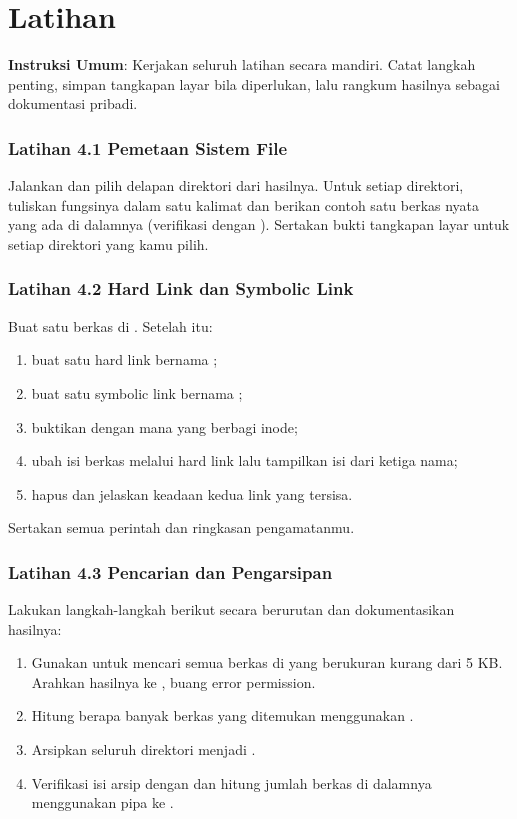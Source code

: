 \section{Latihan}
\label{sec:exercises-filesystem}

\textbf{Instruksi Umum}: Kerjakan seluruh latihan secara mandiri. Catat langkah penting, simpan tangkapan layar bila diperlukan, lalu rangkum hasilnya sebagai dokumentasi pribadi.

\subsubsection*{Latihan 4.1 Pemetaan Sistem File}
Jalankan  dan pilih delapan direktori dari hasilnya. Untuk setiap direktori,
tuliskan fungsinya dalam satu kalimat dan berikan contoh satu berkas nyata yang ada di
dalamnya (verifikasi dengan ). Sertakan bukti tangkapan layar untuk setiap
direktori yang kamu pilih.


\subsubsection*{Latihan 4.2 Hard Link dan Symbolic Link}
Buat satu berkas  di . Setelah itu:
\begin{enumerate}
    \item buat satu hard link bernama ;
    \item buat satu symbolic link bernama ;
    \item buktikan dengan  mana yang berbagi inode;
    \item ubah isi berkas melalui hard link lalu tampilkan isi dari ketiga nama;
    \item hapus  dan jelaskan keadaan kedua link yang tersisa.
\end{enumerate}
Sertakan semua perintah dan ringkasan pengamatanmu.


\subsubsection*{Latihan 4.3 Pencarian dan Pengarsipan}
Lakukan langkah-langkah berikut secara berurutan dan dokumentasikan hasilnya:
\begin{enumerate}
    \item Gunakan  untuk mencari semua berkas  di  yang
    berukuran kurang dari 5 KB. Arahkan hasilnya ke , buang
    error permission.
    \item Hitung berapa banyak berkas yang ditemukan menggunakan .
    \item Arsipkan seluruh direktori  menjadi
    .
    \item Verifikasi isi arsip dengan  dan hitung jumlah berkas di
    dalamnya menggunakan pipa ke .
\end{enumerate}

